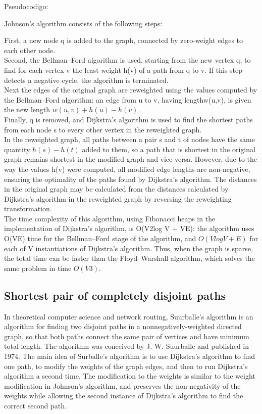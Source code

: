 \documentclass[10pt,letterpaper,twocolumn,twosided]{article}
\begin{document}
Pseudocodigo:

Johnson's algorithm consists of the following steps:

First, a new node q is added to the graph, connected by zero-weight edges to each other node.\\

Second, the Bellman–Ford algorithm is used, starting from the new vertex q, to find for each vertex v the 
least weight h(v) of a path from q to v. If this step detects a negative cycle, the algorithm is terminated.\\

Next the edges of the original graph are reweighted using the values computed by the Bellman–Ford algorithm: 
an edge from u to v, having lengthw(u,v), is given the new length $ w(u,v) + h(u) - h(v).$\\

Finally, q is removed, and Dijkstra's algorithm is used to find the shortest paths from each node s to every
other vertex in the reweighted graph.\\

In the reweighted graph, all paths between a pair s and t of nodes have the same quantity $h(s) - h(t)$ added to
them, so a path that is shortest in the original graph remains shortest in the modified graph and vice versa.
However, due to the way the values h(v) were computed, all modified edge lengths are non-negative, ensuring the
optimality of the paths found by Dijkstra's algorithm. The distances in the original graph may be calculated from 
the distances calculated by Dijkstra's algorithm in the reweighted graph by reversing the reweighting transformation.\\

The time complexity of this algorithm, using Fibonacci heaps in the implementation of Dijkstra's algorithm, 
is O(V2log V + VE): the algorithm uses O(VE) time for the Bellman–Ford stage of the algorithm, and $O(V log V + E)$
for each of V instantiations of Dijkstra's algorithm. Thus, when the graph is sparse, the total time can be faster
than the Floyd–Warshall algorithm, which solves the same problem in time $ O(V3).$\\


\subsection{Shortest pair of completely disjoint paths}

In theoretical computer science and network routing, Suurballe's algorithm is an algorithm for finding two
disjoint paths in a nonnegatively-weighted directed graph, so that both paths connect the same pair of vertices
and have minimum total length. The algorithm was conceived by J. W. Suurballe and published in 1974. The main idea
of Surballe's algorithm is to use Dijkstra's algorithm to find one path, to modify the weights of the graph edges,
and then to run Dijkstra's algorithm a second time. The modification to the weights is similar to the weight 
modification in Johnson's algorithm, and preserves the non-negativity of the weights while allowing the second
instance of Dijkstra's algorithm to find the correct second path.
\end{document}
